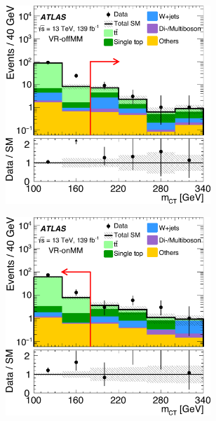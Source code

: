 \begin{figure}
\begin{subfigure}[b]{0.5\linewidth}
	\end{subfigure}\hfill
	\par\bigskip
	\begin{subfigure}[b]{0.5\linewidth}
		\centering\includegraphics[width=0.85\textwidth]{fig_03d_yellow}
	\end{subfigure}\hfill
	\begin{subfigure}[b]{0.5\linewidth}
		\centering\includegraphics[width=0.85\textwidth]{fig_03c_yellow}
	\end{subfigure}\hfill
	\par\bigskip

\end{figure}
